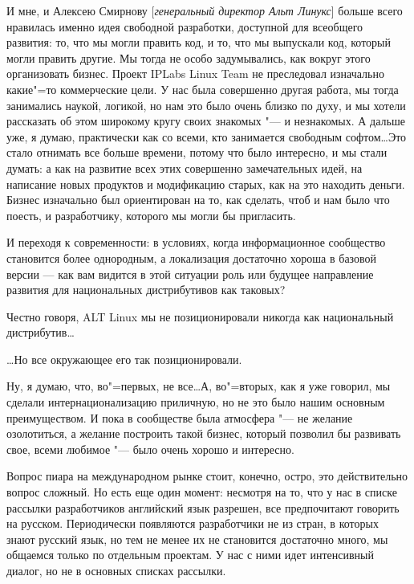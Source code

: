 \documentclass[10pt, a5paper]{article}
\begin{document}
И мне, и Алексею Смирнову [\emph{генеральный директор Альт Линукс}]  больше всего нравилась именно идея свободной разработки, доступной для всеобщего развития: то, что мы могли править код, и то, что мы выпускали код, который могли править другие. Мы тогда не особо задумывались, как вокруг этого организовать бизнес. Проект  IPLabs Linux Team не преследовал изначально какие"=то коммерческие цели. У нас была  совершенно другая работа, мы тогда занимались наукой, логикой, но нам это было очень близко по духу, и мы хотели рассказать об этом широкому кругу своих знакомых "--- и незнакомых. А дальше уже, я думаю, практически как со всеми, кто занимается свободным софтом\ldots Это стало отнимать все больше времени, потому что было интересно, и мы стали думать: а как на развитие всех этих совершенно замечательных идей, на написание новых продуктов и модификацию старых, как на это находить деньги. Бизнес изначально был ориентирован на то, как сделать, чтоб и нам было что поесть, и разработчику, которого мы могли бы пригласить. 

\q И переходя к современности: в условиях, когда информационное сообщество становится более однородным, а локализация  достаточно хороша в базовой версии — как вам видится в этой ситуации роль или будущее направление развития для национальных дистрибутивов как таковых?

\a Честно говоря, ALT Linux мы не позиционировали никогда как национальный дистрибутив\ldots

\q \ldots Но все окружающее его так позиционировали.

\a Ну, я думаю, что, во"=первых, не все\ldots А, во"=вторых, как я уже говорил, мы сделали интернационализацию приличную, но не это было нашим основным преимуществом. И пока в сообществе была атмосфера "--- не желание озолотиться, а желание построить такой бизнес, который позволил бы развивать свое, всеми любимое "--- было очень хорошо и интересно.

Вопрос пиара на международном рынке стоит, конечно, остро, это действительно вопрос сложный. Но есть еще один момент: несмотря на то, что у нас в списке рассылки разработчиков английский язык разрешен, все предпочитают говорить на русском. Периодически появляются разработчики не из стран, в которых знают русский язык, но тем не менее их не становится достаточно много, мы общаемся только по отдельным проектам. У нас с ними идет интенсивный диалог, но не в основных списках рассылки. 
\end{document}
